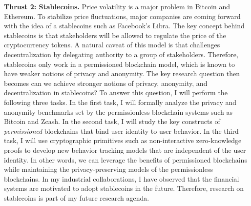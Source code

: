 \documentclass{NSF}
\newcommand{\BfPara}[1]{{\noindent\textbf{#1.}}\xspace}
\begin{document}
\BfPara{Thrust 2: Stablecoins} Price volatility is a major problem in Bitcoin and Ethereum. To stabilize price fluctuations, major companies are coming forward with the idea of a stablecoins such as Facebook's Libra. The key concept behind stablecoins is that stakeholders will be allowed to regulate the price of the cryptocurrency tokens. A natural caveat of this model is that challenges decentralization by delegating authority to a group of stakeholders. Therefore, stablecoins only work in a permissioned blockchain model, which is known to have weaker notions of privacy and anonymity. The key research question then becomes can we achieve stronger notions of privacy, anonymity, and decentralization in stablecoins? To answer this question, I will perform the following three tasks. In the first task, I will formally analyze the privacy and anonymity benchmarks set by the permissionless blockchain systems such as Bitcoin and Zcash. In the second task, I will study the key constructs of {\em permissioned} blockchains that bind user identity to user behavior. In the third task, I will use cryptographic primitives such as non-interactive zero-knowledge proofs to develop new behavior tracking models that are independent of the user identity. In other words, we can leverage the benefits of permissioned blockchains while maintaining the privacy-preserving models of the permissionless blockchains. In my industrial collaborations, I have observed that the financial systems are motivated to adopt stablecoins in the future. Therefore, research on stablecoins is part of my future research agenda. 
\end{document}
